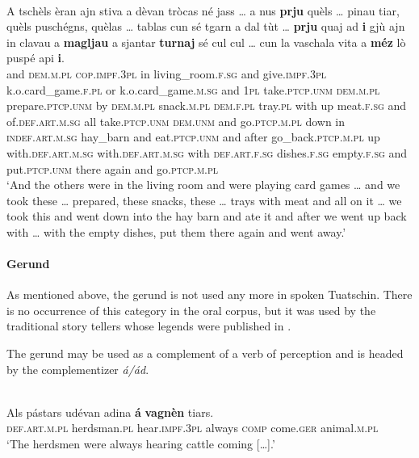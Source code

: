 \ea\label{ex:omit:1}
\\
\gll    A tschèls èran ajn stiva a dèvan tròcas né jass … a nus \textbf{prju} quèls … pinau tiar, quèls puschégns, quèlas … tablas cun sé tgarn a dal tùt … \textbf{prju} quaj ad \textbf{i} gjù ajn in clavau a \textbf{magljau} a sjantar \textbf{turnaj} sé cul cul … cun la vaschala vita a \textbf{méz} lò puspé api \textbf{i}.\\
and \textsc{dem.m.pl} \textsc{cop.impf.3pl} in living\_room.\textsc{f.sg} and give.\textsc{impf.3pl} k.o.card\_game.\textsc{f.pl} or k.o.card\_game.\textsc{m.sg} {} and \textsc{1pl} take.\textsc{ptcp.unm} \textsc{dem.m.pl} {} prepare.\textsc{ptcp.unm} by \textsc{dem.m.pl} snack.\textsc{m.pl}  \textsc{dem.f.pl} {} tray.\textsc{pl} with up meat.\textsc{f.sg} and of.\textsc{def.art.m.sg} all {} take.\textsc{ptcp.unm} \textsc{dem.unm} and go.\textsc{ptcp.m.pl} down in \textsc{indef.art.m.sg} hay\_barn and eat.\textsc{ptcp.unm} and after go\_back.\textsc{ptcp.m.pl} up with.\textsc{def.art.m.sg} with.\textsc{def.art.m.sg} {} with \textsc{def.art.f.sg} dishes.\textsc{f.sg} empty.\textsc{f.sg} and put.\textsc{ptcp.unm} there again and go.\textsc{ptcp.m.pl}\\
\glt `And the others were in the living room and were playing card games … and we took these … prepared, these snacks, these … trays with meat and all on it … we took this and went down into the hay barn and ate it and after we went up back with … with the empty dishes, put them there again and went away.'
\z

\paragraph{Gerund}

As mentioned above, the gerund is not used any more in spoken Tuatschin. There is no occurrence of this category in the oral corpus, but it was used by the traditional story tellers whose legends were published in \citet{Büchli1966}.

The gerund may be used as a complement of a verb of perception and is headed by the complementizer \textit{á/ád}. 

\ea\label{}
 {\citealt[53]{Büchli1966}}\\
\gll    Als pástars udévan adina \textbf{á} \textbf{vagnèn} tiars.\\
   \textsc{def.art.m.pl} herdsman.\textsc{pl} hear.\textsc{impf.3pl} always \textsc{comp} come.\textsc{ger}  animal.\textsc{m.pl}\\
\glt `The herdsmen were always hearing cattle coming […].'
\z

